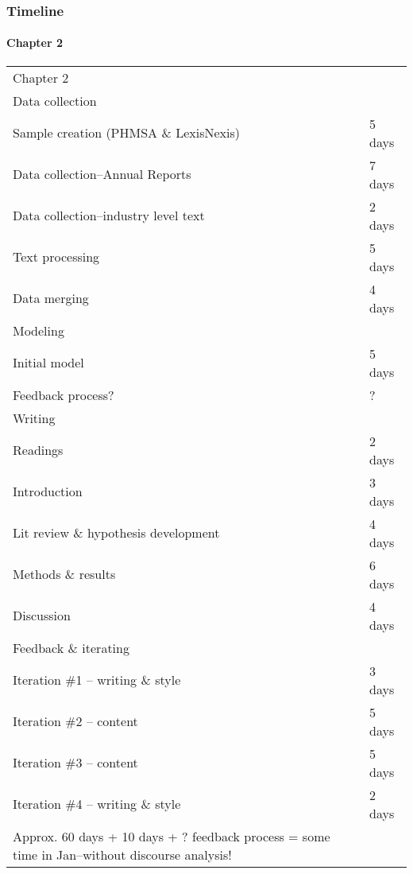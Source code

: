 \begin{frame}
	\frametitle{Timeline}
	\framesubtitle{Chapter 2}
	\tiny
	\begin{tabular}{ l l }
		Chapter 2 & \\
		Data collection	& \\
		\tabindent Sample creation (PHMSA \& LexisNexis)	& 5 days\\
		\tabindent Data collection--Annual Reports			& 7 days\\
		\tabindent Data collection--industry level text		& 2 days\\
		\tabindent Text processing							& 5 days\\
		\tabindent Data merging								& 4 days\\
		Modeling											& \\
		\tabindent Initial model							& 5 days\\
		\tabindent Feedback process?						& ?\\
		Writing												& \\
		\tabindent Readings									& 2 days\\
		\tabindent Introduction								& 3 days\\
		\tabindent Lit review \& hypothesis development		& 4 days\\
		\tabindent Methods \& results						& 6 days\\
		\tabindent Discussion								& 4 days\\
		Feedback \& iterating								& \\
		\tabindent Iteration \#1 -- writing \& style		& 3 days\\
		\tabindent Iteration \#2 -- content					& 5 days\\
		\tabindent Iteration \#3 -- content					& 5 days\\
		\tabindent Iteration \#4 -- writing \& style		& 2 days\\
		\hline
		Approx. 60 days + 10 days + ? feedback process = some time in Jan--without discourse analysis!
	\end{tabular}
\end{frame}

